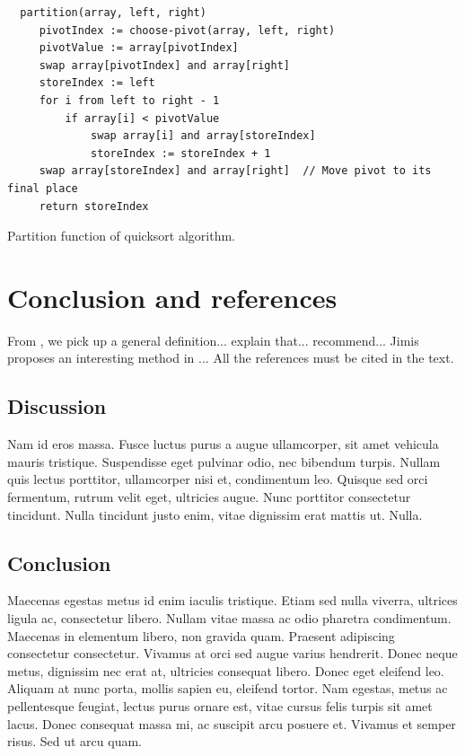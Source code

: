 \documentclass{jimis}
\begin{document}
\begin{listing}
  \begin{lstlisting}
  partition(array, left, right)
     pivotIndex := choose-pivot(array, left, right)
     pivotValue := array[pivotIndex]
     swap array[pivotIndex] and array[right]
     storeIndex := left
     for i from left to right - 1
         if array[i] < pivotValue
             swap array[i] and array[storeIndex]
             storeIndex := storeIndex + 1
     swap array[storeIndex] and array[right]  // Move pivot to its final place
     return storeIndex
  \end{lstlisting}
  \caption{Partition function of quicksort algorithm.}
  \label{lst:example}
\end{listing}

\section{Conclusion and references}
From \citet{sinclair91corpus}, we pick up a general definition... \citet{ounis00flidar} explain that... \citet{wood92artifacts} recommend... Jimis proposes an interesting method in \citet{jimis}... All the references must be cited in the text.

\nocite{hentschel07acceptance,biodiversa,pubmed,antonymy02perspective,justeson01cooccurence,r-project,perotti2015,petrone:hal-01191886}

\subsection{Discussion}
Nam id eros massa. Fusce luctus purus a augue ullamcorper, sit amet vehicula mauris
tristique. Suspendisse eget pulvinar odio, nec bibendum turpis. Nullam quis lectus porttitor,
ullamcorper nisi et, condimentum leo. Quisque sed orci fermentum, rutrum velit eget, ultricies
augue. Nunc porttitor consectetur tincidunt. Nulla tincidunt justo enim, vitae dignissim erat
mattis ut. Nulla.

\subsection{Conclusion}
Maecenas egestas metus id enim iaculis tristique. Etiam sed nulla viverra, ultrices ligula ac,
consectetur libero. Nullam vitae massa ac odio pharetra condimentum. Maecenas in
elementum libero, non gravida quam. Praesent adipiscing consectetur consectetur. Vivamus at
orci sed augue varius hendrerit. Donec neque metus, dignissim nec erat at, ultricies consequat
libero. Donec eget eleifend leo. Aliquam at nunc porta, mollis sapien eu, eleifend tortor. Nam
egestas, metus ac pellentesque feugiat, lectus purus ornare est, vitae cursus felis turpis sit amet
lacus. Donec consequat massa mi, ac suscipit arcu posuere et. Vivamus et semper risus. Sed ut
arcu quam.
\end{document}
